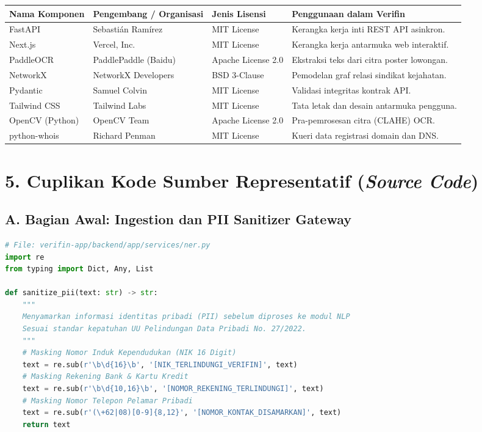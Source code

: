 \documentclass[11pt,a4paper]{article}
\begin{document}
\begin{table}[h!]
\centering
\small
\begin{tabularx}{\textwidth}{@{}p{3.2cm}p{4cm}p{2.8cm}X@{}}
\toprule
\textbf{Nama Komponen} & \textbf{Pengembang / Organisasi} & \textbf{Jenis Lisensi} & \textbf{Penggunaan dalam Verifin} \\
\midrule
FastAPI & Sebastián Ramírez & MIT License & Kerangka kerja inti REST API asinkron. \\
Next.js & Vercel, Inc. & MIT License & Kerangka kerja antarmuka web interaktif. \\
PaddleOCR & PaddlePaddle (Baidu) & Apache License 2.0 & Ekstraksi teks dari citra poster lowongan. \\
NetworkX & NetworkX Developers & BSD 3-Clause & Pemodelan graf relasi sindikat kejahatan. \\
Pydantic & Samuel Colvin & MIT License & Validasi integritas kontrak API. \\
Tailwind CSS & Tailwind Labs & MIT License & Tata letak dan desain antarmuka pengguna. \\
OpenCV (Python) & OpenCV Team & Apache License 2.0 & Pra-pemrosesan citra (CLAHE) OCR. \\
python-whois & Richard Penman & MIT License & Kueri data registrasi domain dan DNS. \\
\bottomrule
\end{tabularx}
\end{table}

\vspace{0.5em}
\section*{5. Cuplikan Kode Sumber Representatif (\textit{Source Code})}

\subsection*{A. Bagian Awal: Ingestion dan PII Sanitizer Gateway}
\begin{lstlisting}[language=Python]
# File: verifin-app/backend/app/services/ner.py
import re
from typing import Dict, Any, List

def sanitize_pii(text: str) -> str:
    """
    Menyamarkan informasi identitas pribadi (PII) sebelum diproses ke modul NLP
    Sesuai standar kepatuhan UU Pelindungan Data Pribadi No. 27/2022.
    """
    # Masking Nomor Induk Kependudukan (NIK 16 Digit)
    text = re.sub(r'\b\d{16}\b', '[NIK_TERLINDUNGI_VERIFIN]', text)
    # Masking Rekening Bank & Kartu Kredit
    text = re.sub(r'\b\d{10,16}\b', '[NOMOR_REKENING_TERLINDUNGI]', text)
    # Masking Nomor Telepon Pelamar Pribadi
    text = re.sub(r'(\+62|08)[0-9]{8,12}', '[NOMOR_KONTAK_DISAMARKAN]', text)
    return text
\end{lstlisting}
\end{document}
